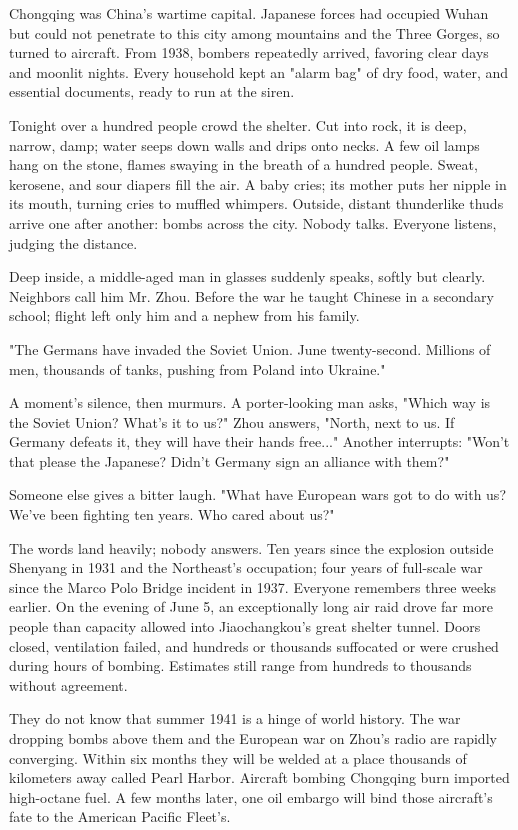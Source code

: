 Chongqing was China's wartime capital. Japanese forces had occupied Wuhan but could not penetrate to this city among mountains and the Three Gorges, so turned to aircraft. From 1938, bombers repeatedly arrived, favoring clear days and moonlit nights. Every household kept an "alarm bag" of dry food, water, and essential documents, ready to run at the siren.

Tonight over a hundred people crowd the shelter. Cut into rock, it is deep, narrow, damp; water seeps down walls and drips onto necks. A few oil lamps hang on the stone, flames swaying in the breath of a hundred people. Sweat, kerosene, and sour diapers fill the air. A baby cries; its mother puts her nipple in its mouth, turning cries to muffled whimpers. Outside, distant thunderlike thuds arrive one after another: bombs across the city. Nobody talks. Everyone listens, judging the distance.

Deep inside, a middle-aged man in glasses suddenly speaks, softly but clearly. Neighbors call him Mr. Zhou. Before the war he taught Chinese in a secondary school; flight left only him and a nephew from his family.

"The Germans have invaded the Soviet Union. June twenty-second. Millions of men, thousands of tanks, pushing from Poland into Ukraine."

A moment's silence, then murmurs. A porter-looking man asks, "Which way is the Soviet Union? What's it to us?" Zhou answers, "North, next to us. If Germany defeats it, they will have their hands free..." Another interrupts: "Won't that please the Japanese? Didn't Germany sign an alliance with them?"

Someone else gives a bitter laugh. "What have European wars got to do with us? We've been fighting ten years. Who cared about us?"

The words land heavily; nobody answers. Ten years since the explosion outside Shenyang in 1931 and the Northeast's occupation; four years of full-scale war since the Marco Polo Bridge incident in 1937. Everyone remembers three weeks earlier. On the evening of June 5, an exceptionally long air raid drove far more people than capacity allowed into Jiaochangkou's great shelter tunnel. Doors closed, ventilation failed, and hundreds or thousands suffocated or were crushed during hours of bombing. Estimates still range from hundreds to thousands without agreement.

They do not know that summer 1941 is a hinge of world history. The war dropping bombs above them and the European war on Zhou's radio are rapidly converging. Within six months they will be welded at a place thousands of kilometers away called Pearl Harbor. Aircraft bombing Chongqing burn imported high-octane fuel. A few months later, one oil embargo will bind those aircraft's fate to the American Pacific Fleet's.

